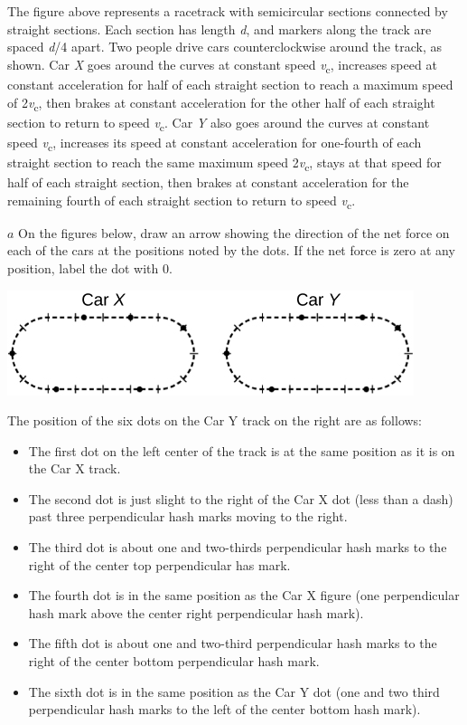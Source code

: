 \documentclass[
]{book}
\providecommand{\tightlist}{%
  \setlength{\itemsep}{0pt}\setlength{\parskip}{0pt}}
\begin{document}
The figure above represents a racetrack with semicircular sections
connected by straight sections. Each section has length \emph{d}, and markers
along the track are spaced \emph{d}/4 apart. Two people drive cars
counterclockwise around the track, as shown. Car \emph{X} goes around the
curves at constant speed \emph{v}\textsubscript{c}, increases speed at constant
acceleration for half of each straight section to reach a maximum speed
of 2\emph{v}\textsubscript{c}, then brakes at constant acceleration for the other half of
each straight section to return to speed \emph{v}\textsubscript{c}. Car \emph{Y} also goes
around the curves at constant speed \emph{v}\textsubscript{c}, increases its speed at
constant acceleration for one-fourth of each straight section to reach
the same maximum speed 2\emph{v}\textsubscript{c}, stays at that speed for half of each
straight section, then brakes at constant acceleration for the remaining
fourth of each straight section to return to speed \emph{v}\textsubscript{c}.

\(a\) On the figures below, draw an arrow showing the direction of the
net force on each of the cars at the positions noted by the dots. If the
net force is zero at any position, label the dot with 0.

\includegraphics{images/Figure_04_01_04.jpg}

The position of the six dots on the Car Y track on the right are as
follows:

\begin{itemize}
\tightlist
\item
  The first dot on the left center of the track is at the same
  position as it is on the Car X track.
\item
  The second dot is just slight to the right of the Car X dot (less
  than a dash) past three perpendicular hash marks moving to the
  right.
\item
  The third dot is about one and two-thirds perpendicular hash marks
  to the right of the center top perpendicular has mark.
\item
  The fourth dot is in the same position as the Car X figure (one
  perpendicular hash mark above the center right perpendicular hash
  mark).
\item
  The fifth dot is about one and two-third perpendicular hash marks to
  the right of the center bottom perpendicular hash mark.
\item
  The sixth dot is in the same position as the Car Y dot (one and two
  third perpendicular hash marks to the left of the center bottom hash
  mark).
\end{itemize}
\end{document}
